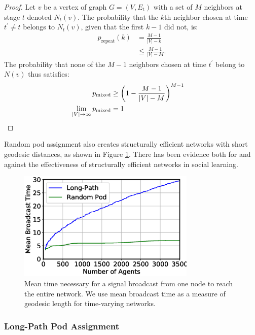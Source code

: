 \begin{proof}
Let $v$ be a vertex of graph $G=(V,E_t)$ with a set of $M$ neighbors at stage $t$ denoted $N_t(v)$.
The probability that the $k$th neighbor chosen at time $t^\prime \neq t$ belongs to $N_t(v)$, given that the first $k - 1$ did not, is:
\begin{align*}
p_\text{repeat}(k)
&= \frac{M - 1}{|V| - k} \\
&\leq \frac{M - 1}{|V| - M}.
\end{align*}
The probability that none of the $M-1$ neighbors chosen at time $t^\prime$ belong to $N(v)$ thus satisfies:
\begin{align*}
p_\text{mixed}
&\geq
\left( 1 - \frac{M - 1}{|V| - M} \right)^{M-1} \\
\lim_{|V|\rightarrow\infty} p_\text{mixed}
&= 1
&\qedhere
\end{align*}
\end{proof}

Random pod assignment also creates structurally efficient networks with short geodesic distances, as shown in Figure \ref{fig:broadcast}.
There has been evidence both for
\cite{lazer_network_2007, derex_partial_2016, mason_propagation_2008, barkoczi_social_2016}
and against
\cite{mason_collaborative_2012, barkoczi_social_2016}
the effectiveness of structurally efficient networks in social learning.

\begin{figure}
    \centering
    \includegraphics[width=3.33in]{chapters/figures/NetDelibABM/fig-broadcast.eps}
    \caption{Mean time necessary for a signal broadcast from one node to reach the entire network. We use mean broadcast time as a measure of geodesic length for time-varying networks.}
    \label{fig:broadcast}
\end{figure}


\subsubsection{Long-Path Pod Assignment}

